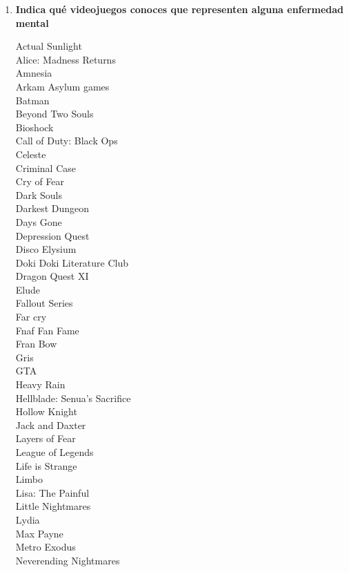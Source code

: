 \documentclass[12pt, a4paper,twoside,titlepage]{book}
\begin{document}
\begin{enumerate}[label=\textbf{\arabic*}.]
     \item \textbf{Indica qué videojuegos conoces que representen alguna enfermedad mental}
     
    \label{listadoVid}
    Actual Sunlight             \\
    Alice: Madness Returns\\
    Amnesia\\
    Arkam Asylum games\\
    Batman\\
    Beyond Two Souls\\
    Bioshock \\
    Call of Duty: Black Ops\\
    Celeste\\
    Criminal Case\\
    Cry of Fear\\
    Dark Souls\\
    Darkest Dungeon\\
    Days Gone\\
    Depression Quest\\
    Disco Elysium\\
    Doki Doki Literature Club\\
    Dragon Quest XI\\
    Elude\\
    Fallout Series\\
    Far cry\\
    Fnaf Fan Fame\\
    Fran Bow\\
    Gris\\
    GTA\\
    Heavy Rain \\
    Hellblade: Senua's Sacrifice\\
    Hollow Knight\\
    Jack and Daxter\\
    Layers of Fear\\
    League of Legends\\
    Life is Strange\\
    Limbo\\
    Lisa: The Painful\\
    Little Nightmares\\
    Lydia\\
    Max Payne\\
    Metro Exodus\\
    Neverending Nightmares\\

\end{enumerate}
\end{document}
